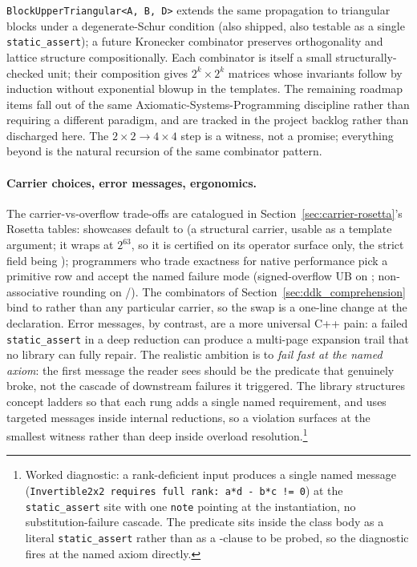 \documentclass[11pt, a4paper]{article}
\begin{document}
\noindent \texttt{BlockUpperTriangular<A, B, D>} extends the same
propagation to triangular blocks under a degenerate-Schur condition
(also shipped, also testable as a single \texttt{static\_assert}); a
future Kronecker combinator preserves orthogonality and lattice
structure compositionally.  Each combinator is itself a small
structurally-checked unit; their composition gives $2^k \times 2^k$
matrices whose invariants follow by induction without exponential
blowup in the templates.  The remaining roadmap items
fall out of the same Axiomatic-Systems-Programming discipline rather
than requiring a different paradigm, and are tracked in the project
backlog rather than discharged here.  The $2 \times 2 \to 4 \times 4$
step is a witness, not a promise; everything beyond is the natural
recursion of the same combinator pattern.

\paragraph{Carrier choices, error messages, ergonomics.}
The carrier-vs-overflow trade-offs are catalogued in
Section~\ref{sec:carrier-rosetta}'s Rosetta tables: showcases default
to  (a structural carrier, usable as a template argument; it wraps at $2^{63}$, so it is certified on its operator surface only, the strict field being ); programmers who trade exactness for native
performance pick a primitive row and accept the named failure mode
(signed-overflow UB on ; non-associative rounding on
/).  The combinators of
Section~\ref{sec:ddk_comprehension} bind to 
rather than any particular carrier, so the swap is a one-line change
at the  declaration.  Error messages, by contrast,
are a more universal C++ pain: a failed \texttt{static\_assert} in a
deep reduction can produce a multi-page expansion trail that no
library can fully repair.  The realistic ambition is to \emph{fail
fast at the named axiom}: the first message the reader sees should
be the predicate that genuinely broke, not the cascade of downstream
failures it triggered.  The library structures concept ladders so
that each rung adds a single named requirement, and uses targeted
 messages inside internal reductions, so a
violation surfaces at the smallest witness rather than deep inside
overload resolution.\footnote{Worked diagnostic: a rank-deficient
 input produces a single
named message (\texttt{Invertible2x2 requires full rank: a*d - b*c
!= 0}) at the \texttt{static\_assert} site with one \texttt{note}
pointing at the instantiation, no substitution-failure cascade.  The
predicate sits inside the class body as a literal
\texttt{static\_assert} rather than as a -clause
to be probed, so the diagnostic fires at the named axiom directly.}
\end{document}
